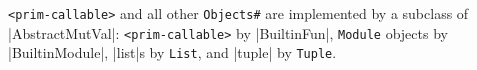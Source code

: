 \verb+<prim-callable>+ and all other
\texttt{Objects\#} are implemented by a subclass of
\pycode|AbstractMutVal|: \verb+<prim-callable>+
by \pycode|BuiltinFun|, \texttt{Module} objects by
\pycode|BuiltinModule|, \pycode|list|s by \texttt{List}, and
\pycode|tuple| by \texttt{Tuple}.

{} {}
